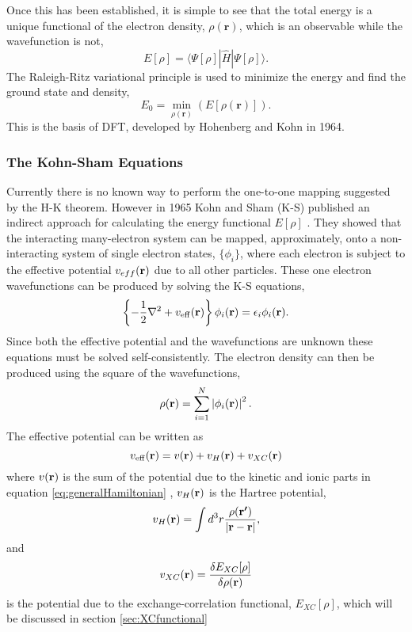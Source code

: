 Once this has been established, it is simple to see that the total energy is a unique functional of the electron density, $\rho(\textbf{r})$, which is an observable while the wavefunction is not,
\begin{equation}
\label{eq:H-KenergyDensity}
 E[\rho] = \langle \Psi[\rho] | \widehat{H} | \Psi[\rho] \rangle.
\end{equation}
The Raleigh-Ritz variational principle is used to minimize the energy and find the ground state and density, %
\begin{equation}
 E_{0} = \min_{\rho(\mathbf{r})} \left(E[\rho(\mathbf{r})] \right).
\label{eq:H-Kvariational}
\end{equation}
This is the basis of DFT, developed by Hohenberg and Kohn \cite{hohenberg1964} in 1964.

\subsubsection{The Kohn-Sham Equations}
Currently there is no known way to perform the one-to-one mapping suggested by the H-K theorem. However in 1965 Kohn and Sham (K-S) published an indirect approach for calculating the energy functional $E[\rho]$ \cite{kohn1965}.
They showed that the interacting many-electron system can be mapped, approximately, onto a non-interacting system of single electron states, $\{\phi_i\}$, where each electron is subject to the effective potential $v_{eff}({\mathrm{\mathbf{\bm{r}}}})$ due to all other particles. These one electron wavefunctions can be produced by solving the K-S equations,
\begin{equation}
\label{eq:K-Sequation}
 \left\{-\frac{1}{2} \nabla ^2 + v_\mathrm{eff}({\mathrm{\mathbf{\bm{r}}}}) \right\} \phi_i({\mathrm{\mathbf{\bm{r}}}}) = \epsilon_i \phi_i({\mathrm{\mathbf{\bm{r}}}}).
\end{equation}
Since both the effective potential and the wavefunctions are unknown these equations must be solved self-consistently.
The electron density can then be produced using the square of the wavefunctions,
\begin{equation}
\label{eq:electronDensity}
 \rho({\mathrm{\mathbf{\bm{r}}}}) = \sum_{i=1}^N \left| \phi_i({\mathrm{\mathbf{\bm{r}}}}) \right|^2.
\end{equation}
The effective potential can be written as
\begin{equation}
\label{eq:effectivePotential}
 v_\mathrm{eff}({\mathrm{\mathbf{\bm{r}}}}) = v({\mathrm{\mathbf{\bm{r}}}}) + v_{H}({\mathrm{\mathbf{\bm{r}}}}) + v_{XC}({\mathrm{\mathbf{\bm{r}}}})
\end{equation}
where $v({\mathrm{\mathbf{\bm{r}}}})$ is the sum of the potential due to the kinetic and ionic parts in equation \ref{eq:generalHamiltonian}%
, $v_{H}({\mathrm{\mathbf{\bm{r}}}})$ is the Hartree potential,
\begin{equation}
\label{eq:hartreePotential}
 v_{H}({\mathrm{\mathbf{\bm{r}}}}) = \int d^3r \frac{\rho({\mathrm{\mathbf{\bm{r'}}}})}{\left| {\mathrm{\mathbf{\bm{r}}}} - {\mathrm{\mathbf{\bm{r}}}} \right|},
\end{equation}
and
\begin{equation}
\label{eq:XCpotential}
 v_{XC}({\mathrm{\mathbf{\bm{r}}}}) = \frac{\delta E_{XC}[\rho]}{\delta \rho({\mathrm{\mathbf{\bm{r}}}})}
\end{equation}
is the potential due to the exchange-correlation functional, $E_{XC}[\rho]$, which will be discussed in section \ref{sec:XCfunctional} 

